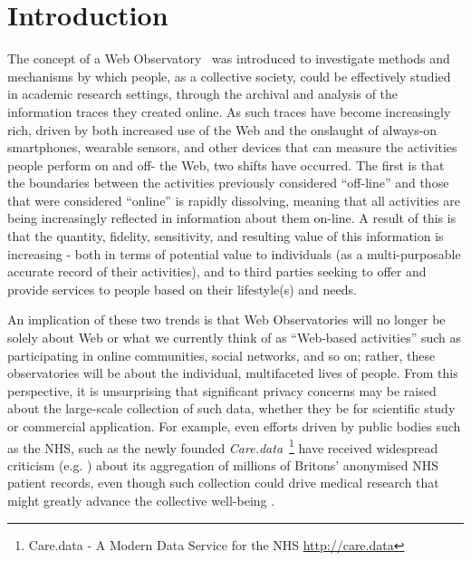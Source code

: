 \documentclass{acm_proc_article-sp}
\begin{document}


\maketitle
\begin{abstract}
\end{abstract}


\section{Introduction}

The concept of a Web Observatory~\cite{Tiropanis2013,Hall2014} was introduced to investigate methods and mechanisms by which people, as a collective society, could be effectively studied in academic research settings, through the archival and analysis of the information traces they created online. As such traces have become increasingly rich, driven by both increased use of the Web and the onslaught of always-on smartphones, wearable sensors, and other devices that can measure the activities people perform on and off- the Web, two shifts have occurred. The first is that the boundaries between the activities previously considered ``off-line'' and those that were considered ``online'' is rapidly dissolving, meaning that all activities are being increasingly reflected in information about them on-line. A result of this is that the quantity, fidelity, sensitivity, and resulting value of this information is increasing - both in terms of potential value to individuals (as a multi-purposable accurate record of their activities), and to third parties seeking to offer and provide services to people based on their lifestyle(s) and needs. 

An implication of these two trends is that Web Observatories will no longer be solely about Web or what we currently think of as ``Web-based activities'' such as participating in online communities, social networks, and so on; rather, these observatories will be about the individual, multifaceted lives of people. From this perspective, it is unsurprising that significant privacy concerns may be raised about the large-scale collection of such data, whether they be for scientific study or commercial application. For example, even efforts driven by public bodies such as the NHS, such as the newly founded \emph{Care.data}~\footnote{Care.data - A Modern Data Service for the NHS \url{http://care.data}} have received widespread criticism (e.g. \cite{RameshNHS}) about its aggregation of millions of Britons' anonymised NHS patient records, even though such collection could drive medical research that might greatly advance the collective well-being \cite{de2006use}.
\end{document}

